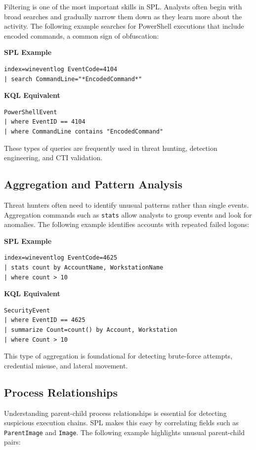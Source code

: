 Filtering is one of the most important skills in SPL. Analysts often begin with broad searches and gradually narrow them down as they learn more about the activity. The following example searches for PowerShell executions that include encoded commands, a common sign of obfuscation:

\textbf{SPL Example}
\begin{lstlisting}
index=wineventlog EventCode=4104
| search CommandLine="*EncodedCommand*"
\end{lstlisting}

\textbf{KQL Equivalent}
\begin{lstlisting}
PowerShellEvent
| where EventID == 4104
| where CommandLine contains "EncodedCommand"
\end{lstlisting}

These types of queries are frequently used in threat hunting, detection engineering, and CTI validation.

\subsection*{Aggregation and Pattern Analysis}

Threat hunters often need to identify unusual patterns rather than single events. Aggregation commands such as \texttt{stats} allow analysts to group events and look for anomalies. The following example identifies accounts with repeated failed logons:

\textbf{SPL Example}
\begin{lstlisting}
index=wineventlog EventCode=4625
| stats count by AccountName, WorkstationName
| where count > 10
\end{lstlisting}

\textbf{KQL Equivalent}
\begin{lstlisting}
SecurityEvent
| where EventID == 4625
| summarize Count=count() by Account, Workstation
| where Count > 10
\end{lstlisting}

This type of aggregation is foundational for detecting brute-force attempts, credential misuse, and lateral movement.

\subsection*{Process Relationships}

Understanding parent-child process relationships is essential for detecting suspicious execution chains. SPL makes this easy by correlating fields such as \texttt{ParentImage} and \texttt{Image}. The following example highlights unusual parent-child pairs:

